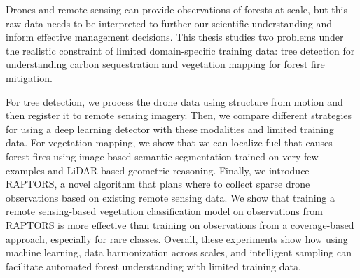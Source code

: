 
\setlength{\parskip}{1em}
\setlength{\parindent}{0em}
Drones and remote sensing can provide observations of forests at scale, but this raw data needs to be interpreted to further our scientific understanding and inform effective management decisions. This thesis studies two problems under the realistic constraint of limited domain-specific training data: tree detection for understanding carbon sequestration and vegetation mapping for forest fire mitigation.

For tree detection, we process the drone data using structure from motion and then register it to remote sensing imagery. Then, we compare different strategies for using a deep learning detector with these modalities and limited training data.
For vegetation mapping, we show that we can localize fuel that causes forest fires using image-based semantic segmentation trained on very few examples and LiDAR-based geometric reasoning. Finally, we introduce RAPTORS, a novel algorithm that plans where to collect sparse drone observations based on existing remote sensing data. We show that training a remote sensing-based vegetation classification model on observations from RAPTORS is more effective than training on observations from a coverage-based approach, especially for rare classes. 
Overall, these experiments show how using machine learning, data harmonization across scales, and intelligent sampling can facilitate automated forest understanding with limited training data.


